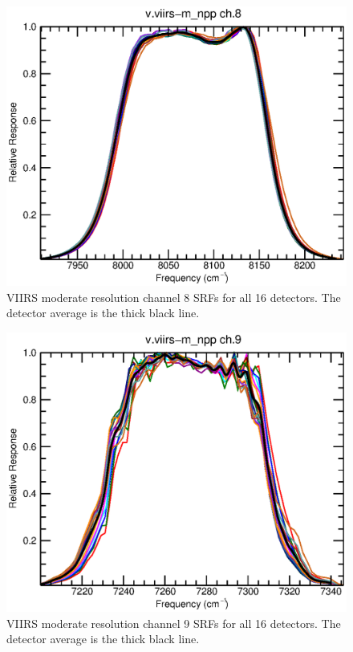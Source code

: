 \begin{figure}[H]
  \centering
  \includegraphics[bb= 0 15 400 330,clip,scale=0.8]{graphics/srfs/v.viirs-m_npp-08.eps}
  \caption{VIIRS moderate resolution channel 8 SRFs for all 16 detectors. The detector average is the thick black line.}
  \label{fig:v.viirs-m_npp-08}
\end{figure}
\begin{figure}[H]
  \centering
  \includegraphics[bb= 0 15 400 330,clip,scale=0.8]{graphics/srfs/v.viirs-m_npp-09.eps}
  \caption{VIIRS moderate resolution channel 9 SRFs for all 16 detectors. The detector average is the thick black line.}
  \label{fig:v.viirs-m_npp-09}
\end{figure}
